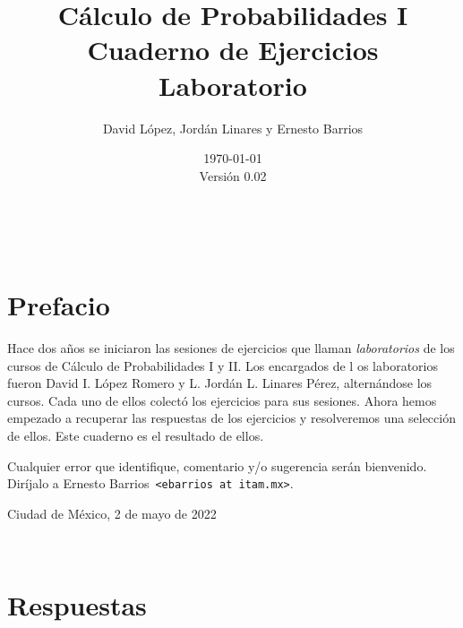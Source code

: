 \documentclass[11pt]{article}
\newcommand{\raiz}{../..}
\newcommand{\home}{\raiz/CP1/}
\def\version{0.02}
\begin{document}

\title{\bf {
		\huge Cálculo de Probabilidades I \\[1ex] 
		\LARGE Cuaderno de Ejercicios \\[1ex]
		\Large Laboratorio
		} }
\author{\large David López, Jordán Linares y Ernesto Barrios}
\date{\today \\[1ex] \small Versión \version}

\maketitle

\tableofcontents

\clearpage \newpage \

\section*{Prefacio}

Hace dos años se iniciaron las sesiones de ejercicios que llaman \emph{laboratorios} de los cursos de Cálculo de Probabilidades I y II. Los encargados de l
os laboratorios fueron David I. López Romero y L. Jordán L. Linares Pérez, alternándose los cursos. Cada uno de ellos colectó los ejercicios para sus sesiones. Ahora hemos empezado a recuperar las respuestas de los ejercicios y resolveremos una selección de ellos. Este cuaderno es el resultado de ellos.

\medskip

\noindent Cualquier error que identifique, comentario y/o sugerencia serán bienvenido. Diríjalo a Ernesto Barrios\ \texttt{<ebarrios at itam.mx>}.

\bigskip

\begin{flushright}Ciudad de México, 2 de mayo de 2022 \end{flushright}

\newpage 


\newpage





\clearpage \newpage \

\renewcommand{\thesubsection}{\arabic{subsection}}
\section*{Respuestas}

\renewcommand{\theenumi}{\thesubsection:\arabic{enumi}}



\end{document}
